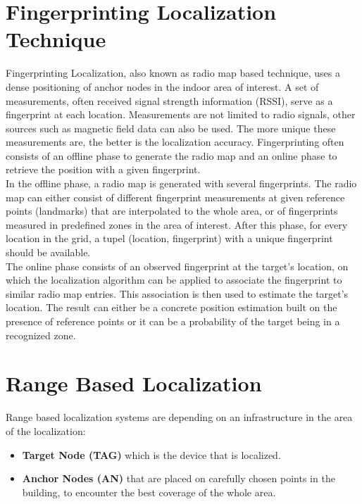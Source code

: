 \section{Fingerprinting Localization Technique}
Fingerprinting Localization, also known as radio map based technique, uses a dense positioning of anchor nodes in the indoor area of interest. A set of measurements, often received signal strength information (RSSI), serve as a fingerprint at each location. Measurements are not limited to radio signals, other sources such as magnetic field data can also be used. The more unique these measurements are, the better is the localization accuracy. Fingerprinting often consists of an offline phase to generate the radio map and an online phase to retrieve the position with a given fingerprint.\\
\noindent\hspace*{5mm}%
In the offline phase, a radio map is generated with several fingerprints. The radio map can either consist of different fingerprint measurements at given reference points (landmarks) that are interpolated to the whole area, or of fingerprints measured in predefined zones in the area of interest. After this phase, for every location in the grid, a tupel (location, fingerprint) with a unique fingerprint should be available.\\
\noindent\hspace*{5mm}%
The online phase consists of an observed fingerprint at the target's location, on which the localization algorithm can be applied to associate the fingerprint to similar radio map entries. This association is then used to estimate the target's location. The result can either be a concrete position estimation built on the presence of reference points or it can be a probability of the target being in a recognized zone. 


\section{Range Based Localization}

Range based localization systems are depending on an infrastructure in the area of the localization:
\begin{itemize} 
\item \textbf{Target Node (TAG)} which is the device that is localized. 
\item \textbf{Anchor Nodes (AN)} that are placed on carefully chosen points in the building, to encounter the best coverage of the whole area.
\end{itemize}

